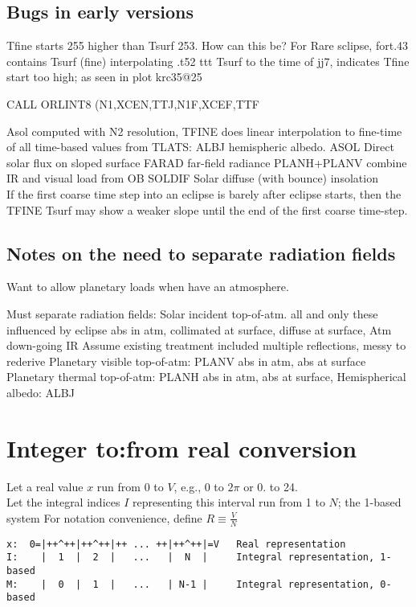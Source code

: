 \documentclass{article}
\begin{document}
\subsection{Bugs in early versions}

Tfine starts  255 higher than Tsurf 253. How can this be?
For Rare sclipse, fort.43 contains Tsurf (fine)
 interpolating .t52 ttt Tsurf to the time of jj7, indicates Tfine start too high;
as seen in plot krc35@25

      CALL ORLINT8 (N1,XCEN,TTJ,N1F,XCEF,TTF

 Asol computed with N2 resolution, 
TFINE does linear interpolation to fine-time of all time-based values from TLATS:
\qi ALBJ   hemispheric albedo.
\qi ASOL Direct solar flux on sloped surface
\qi FARAD  far-field radiance
\qi PLANH+PLANV combine  IR and visual load from OB
\qi SOLDIF  Solar diffuse (with bounce) insolation
\\ If the first coarse time step into an eclipse is barely after eclipse starts, then the TFINE Tsurf may show a weaker slope until the end of the first coarse time-step.

\subsection {Notes on the need to separate radiation fields}
Want to allow planetary loads when have an atmosphere.

Must separate radiation fields:
\qi Solar incident top-of-atm. all and only these influenced by eclipse
\qii  abs in atm,  
\qii  collimated at surface,  
\qii  diffuse at surface,
\qii  [lost]
\qi Atm down-going IR
\qii  Assume existing treatment included multiple reflections, messy to rederive
\qi Planetary visible top-of-atm:  PLANV
\qii  abs in atm, 
\qii  abs at surface
\qii  [lost]
\qi Planetary thermal top-of-atm:  PLANH
\qii  abs in atm,  
\qii  abs at surface,
\qii  [lost]
\qi Hemispherical albedo: ALBJ

\section{Integer to:from real conversion}
Let a real value $x$ run from 0 to $V$, e.g., 0 to $2\pi$ or  0. to 24.
\\ Let the integral indices $I$ representing this interval run from 1 to $N$; the 1-based system
\qi For notation convenience, define $R \equiv \frac{V}{N}$
\vspace{-3.mm} 
\begin{verbatim}
x:  0=|++^++|++^++|++ ... ++|++^++|=V   Real representation
I:    |  1  |  2  |   ...   |  N  |     Integral representation, 1-based
M:    |  0  |  1  |   ...   | N-1 |     Integral representation, 0-based
\end{verbatim}    
\end{document}
